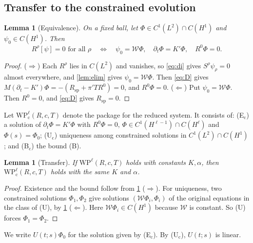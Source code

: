 \documentclass[11pt]{article}
\theoremstyle{plain}
\newtheorem{lemma}[theorem]{Lemma}
\theoremstyle{definition}
\theoremstyle{remark}
\newcommand{\Wcal}{\mathcal{W}}
\newcommand{\WP}{\mathrm{WP}}
\begin{document}
\subsection{Transfer to the constrained evolution}\label{sec:transfer}

\begin{lemma}[Equivalence]\label{lem:equivalence}
On a fixed ball, let $\Phi \in C^1(L^2)\cap C(H^1)$ and $\psi_0 \in C(H^1)$. Then
\[
  R^\rho[\psi] = 0 \text{ for all } \rho
  \quad\Longleftrightarrow\quad
  \psi_0 = \Wcal\Phi,\quad \partial_t\Phi = K'\Phi,\quad R^0\Phi = 0 .
\]
\end{lemma}

\begin{proof}
($\Rightarrow$) Each $R^\rho$ lies in $C(L^2)$ and vanishes, so \eqref{eq:di} gives $S^\rho\psi_\rho = 0$ almost everywhere, and \cref{lem:elim} gives $\psi_0 = \Wcal\Phi$. Then \eqref{eq:D} gives $M(\partial_t - K')\Phi = -(R_{\mathrm{sp}} + \pi' TR^0) = 0$, and $R^0\Phi = 0$.
($\Leftarrow$) Put $\psi_0 = \Wcal\Phi$. Then $R^0 = 0$, and \eqref{eq:D} gives $R_{\mathrm{sp}} = 0$.
\end{proof}

Let $\WP_{\mathrm c}^\ell(R,c,T)$ denote the package for the reduced system. It consists of: (E$_{\mathrm c}$) a solution of $\partial_t\Phi = K'\Phi$ with $R^0\Phi = 0$, $\Phi \in C^1(H^{\ell-1})\cap C(H^\ell)$ and $\Phi(s) = \Phi_0$; (U$_{\mathrm c}$) uniqueness among constrained solutions in $C^1(L^2)\cap C(H^1)$; and (B$_{\mathrm c}$) the bound (B).

\begin{lemma}[Transfer]\label{lem:transfer}
If $\WP^\ell(R,c,T)$ holds with constants $K,\alpha$, then $\WP_{\mathrm c}^\ell(R,c,T)$ holds with the same $K$ and $\alpha$.
\end{lemma}

\begin{proof}
Existence and the bound follow from \cref{lem:equivalence} ($\Rightarrow$). For uniqueness, two constrained solutions $\Phi_1,\Phi_2$ give solutions $(\Wcal\Phi_i,\Phi_i)$ of the original equations in the class of (U), by \cref{lem:equivalence} ($\Leftarrow$). Here $\Wcal\Phi_i \in C(H^1)$ because $\Wcal$ is constant. So (U) forces $\Phi_1 = \Phi_2$.
\end{proof}

We write $U(t;s)\Phi_0$ for the solution given by (E$_{\mathrm c}$). By (U$_{\mathrm c}$), $U(t;s)$ is linear.

\end{document}
